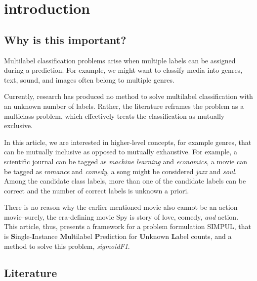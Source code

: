 
\section{introduction}
\label{sec:org662677c}





\subsection{Why is this important?}

Multilabel classification problems arise when multiple labels can be assigned during a prediction. For example, we might want to classify media into genres, text, sound, and images often belong to multiple genres.


Currently, research has produced no method to solve multilabel classification with an unknown number of labels. Rather, the literature reframes the problem as a multiclass problem, which effectively treats the classification as mutually exclusive. 


In this article, we are interested in higher-level concepts, for example genres, that can be mutually inclusive as opposed to mutually exhaustive. For example, a scientific journal can be tagged as \emph{machine learning} and \emph{economics}, a movie can be tagged as \emph{romance} and \emph{comedy}, a song might be considered \emph{jazz} and \emph{soul}. Among the candidate class labels, more than one of the candidate labels can be correct and the number of correct labels is unknown a priori. 



There is no reason why the earlier mentioned movie also cannot be an action movie–surely, the era-defining movie Spy is story of love, comedy, \textit{and} action. This article, thus, presents a framework for a problem formulation  SIMPUL, that is \textbf{S}ingle-\textbf{I}nstance \textbf{M}ultilabel \textbf{P}rediction for \textbf{U}nknown \textbf{L}abel counts, and a method to solve this problem, \emph{sigmoidF1}. 

\subsection{Literature}


